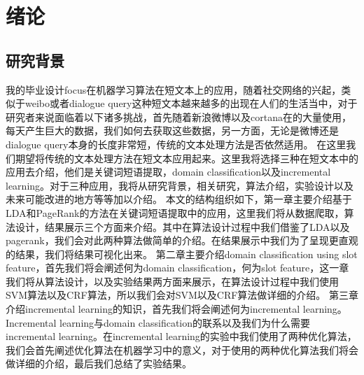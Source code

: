 \documentclass[master]{njuthesis}
\begin{document}
\tableofcontents

\listoffigures

\listoftables

\mainmatter

\chapter{绪论}\label{chapter_introduction}
\section{研究背景}

我的毕业设计focus在机器学习算法在短文本上的应用，随着社交网络的兴起，类似于weibo或者dialogue query这种短文本越来越多的出现在人们的生活当中，对于研究者来说面临着以下诸多挑战，首先随着新浪微博以及cortana在的大量使用，每天产生巨大的数据，我们如何去获取这些数据，另一方面，无论是微博还是dialogue query本身的长度非常短，传统的文本处理方法是否依然适用。
在这里我们期望将传统的文本处理方法在短文本应用起来。这里我将选择三种在短文本中的应用去介绍，他们是关键词短语提取，domain classification以及incremental learning。对于三种应用，我将从研究背景，相关研究，算法介绍，实验设计以及未来可能改进的地方等等加以介绍。
本文的结构组织如下，第一章主要介绍基于LDA和PageRank的方法在关键词短语提取中的应用，这里我们将从数据爬取，算法设计，结果展示三个方面来介绍。其中在算法设计过程中我们借鉴了LDA以及pagerank，我们会对此两种算法做简单的介绍。在结果展示中我们为了呈现更直观的结果，我们将结果可视化出来。
第二章主要介绍domain classification using slot feature，首先我们将会阐述何为domain classification，何为slot feature，这一章我们将从算法设计，以及实验结果两方面来展示，在算法设计过程中我们使用SVM算法以及CRF算法，所以我们会对SVM以及CRF算法做详细的介绍。
第三章介绍incremental learning的知识，首先我们将会阐述何为incremental learning。Incremental learning与domain classification的联系以及我们为什么需要incremental learning。在incremental learning的实验中我们使用了两种优化算法，我们会首先阐述优化算法在机器学习中的意义，对于使用的两种优化算法我们将会做详细的介绍，最后我们总结了实验结果。
\end{document}
